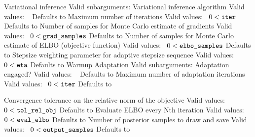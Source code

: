 \begin{description}
%
    {Variational inference}
    {Valid subarguments: }
%
      {Variational inference algorithm}
      {Valid values: \ }
      {Defaults to }
%
      {Maximum number of iterations}
      {Valid values: \ $0 < \mbox{{\tt iter}}$}
      {Defaults to }
%
      {Number of samples for Monte Carlo estimate of gradients}
      {Valid values: \ $0 < \mbox{{\tt grad\_samples}}$}
      {Defaults to }
%
      {Number of samples for Monte Carlo estimate of ELBO (objective function)}
      {Valid values: \ $0 < \mbox{{\tt elbo\_samples}}$}
      {Defaults to }
%
      {Stepsize weighting parameter for adaptive stepsize sequence}
      {Valid values: \ $0 < \mbox{{\tt eta}}$}
      {Defaults to }
%
      {Warmup Adaptation}
      {Valid subarguments: }
%
        {Adaptation engaged?}
        {Valid values: \ }
        {Defaults to }
%
        {Maximum number of adaptation iterations}
        {Valid values: \  $0 < \mbox{{\tt iter}}$}
        {Defaults to }
%

      {Convergence tolerance on the relative norm of the objective}
      {Valid values: \ $0 < \mbox{{\tt tol\_rel\_obj}}$}
      {Defaults to }
%
      {Evaluate ELBO every Nth iteration}
      {Valid values: \ $0 < \mbox{{\tt eval\_elbo}}$}
      {Defaults to }
%
      {Number of posterior samples to draw and save}
      {Valid values: \ $0 < \mbox{{\tt output\_samples}}$}
      {Defaults to }
\end{description}
%

